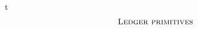 \begin{ruledfigure}{t}
  \begin{displaymath}
    \begin{array}{rll}
      \multicolumn{3}{l}{\textsc{Ledger primitives}}\\

\end{array}
\end{displaymath}
\end{ruledfigure}
